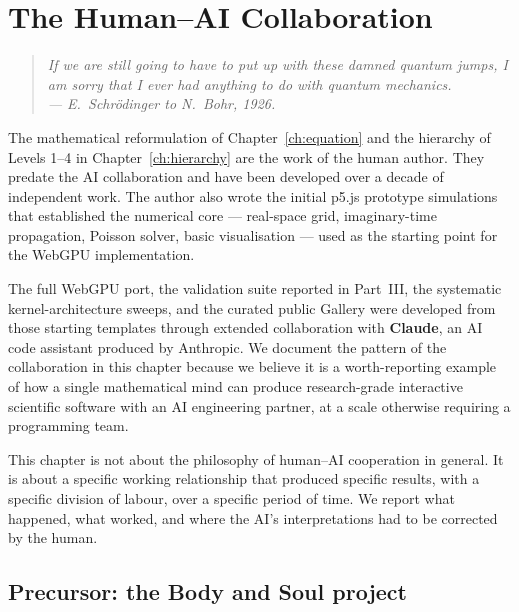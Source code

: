 \chapter{The Human--AI Collaboration}\label{ch:collab}

\begin{quote}
\itshape If we are still going to have to put up with these damned quantum jumps, I am sorry that I ever had anything to do with quantum mechanics.\\
\normalfont\hfill --- E.~Schr\"odinger to N.~Bohr, 1926.
\end{quote}
\bigskip

The mathematical reformulation of Chapter~\ref{ch:equation} and the hierarchy of Levels 1--4 in Chapter~\ref{ch:hierarchy} are the work of the human author. They predate the AI collaboration and have been developed over a decade of independent work. The author also wrote the initial p5.js prototype simulations that established the numerical core --- real-space grid, imaginary-time propagation, Poisson solver, basic visualisation --- used as the starting point for the WebGPU implementation.

The full WebGPU port, the validation suite reported in Part~III, the systematic kernel-architecture sweeps, and the curated public Gallery were developed from those starting templates through extended collaboration with \textbf{Claude}, an AI code assistant produced by Anthropic. We document the pattern of the collaboration in this chapter because we believe it is a worth-reporting example of how a single mathematical mind can produce research-grade interactive scientific software with an AI engineering partner, at a scale otherwise requiring a programming team.

This chapter is not about the philosophy of human--AI cooperation in general. It is about a specific working relationship that produced specific results, with a specific division of labour, over a specific period of time. We report what happened, what worked, and where the AI's interpretations had to be corrected by the human.

\section{Precursor: the Body and Soul project}\label{sec:body-and-soul}

